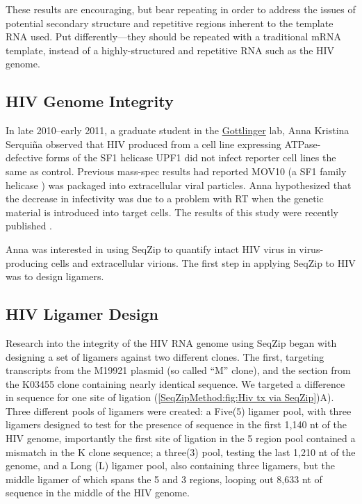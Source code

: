      These results are encouraging, but bear repeating in order to address the issues of potential secondary structure and repetitive regions inherent to the template RNA used. Put differently---they should be repeated with a traditional mRNA template, instead of a highly-structured and repetitive RNA such as the HIV genome.

  \subsection{HIV Genome Integrity}
    \label{SeqZipMethod:subsec: Why use SeqZip to look at HIV genomes}

    In late 2010--early 2011, a graduate student in the \href{http://profiles.umassmed.edu/profiles/display/133484}{Gottlinger} lab, Anna Kristina Serquiña observed that HIV produced from a cell line expressing ATPase-defective forms of the SF1 helicase UPF1 \citep{Bhattacharya2000} did not infect reporter cell lines the same as control. Previous mass-spec results had reported MOV10 (a SF1 family helicase \citep{Gregersen2014}) was packaged into extracellular viral particles. Anna hypothesized that the decrease in infectivity was due to a problem with RT when the genetic material is introduced into target cells. The results of this study were recently published \citep{Serquina2013}.

    Anna was interested in using SeqZip to quantify intact HIV virus in virus-producing cells and extracellular virions. The first step in applying SeqZip to HIV was to design ligamers.

	\subsection{HIV Ligamer Design}
    \label{SeqZipMethod:subsec: Design of HIV ligamers}

	  Research into the integrity of the HIV RNA genome using SeqZip began with designing a set of ligamers against two different clones. The first, targeting transcripts from the M19921 plasmid (so called ``M'' clone), and the section from the K03455 clone containing nearly identical sequence. We targeted a difference in sequence for one site of ligation (\ref{SeqZipMethod:fig:Hiv tx via SeqZip})A). Three different pools of ligamers were created: a Five(5) ligamer pool, with three ligamers designed to test for the presence of sequence in the first 1,140 nt of the HIV genome, importantly the first site of ligation in the 5 region pool contained a mismatch in the K clone sequence; a three(3) pool, testing the last 1,210 nt of the genome, and a Long (L) ligamer pool, also containing three ligamers, but the middle ligamer of which spans the 5 and 3 regions, looping out 8,633 nt of sequence in the middle of the HIV genome. 

